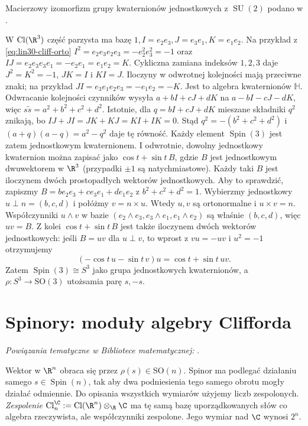 Macierzowy izomorfizm grupy kwaternionów jednostkowych z $\operatorname{SU}(2)$ podano w .

\begin{przyklad}
\label{prz:lin31-spin3}
W $\operatorname{Cl}(\R^3)$ część parzysta ma bazę
$1,I=e_2e_3,J=e_3e_1,K=e_1e_2$.
Na przykład z \eqref{eq:lin30-cliff-orto}
$I^2=e_2e_3e_2e_3=-e_2^2e_3^2=-1$ oraz
$IJ=e_2e_3e_3e_1=-e_2e_1=e_1e_2=K$.
Cykliczna zamiana indeksów $1,2,3$ daje
$J^2=K^2=-1$, $JK=I$ i $KI=J$.
Iloczyny w odwrotnej kolejności mają przeciwne znaki;
na przykład $JI=e_3e_1e_2e_3=-e_1e_2=-K$.
Jest to algebra kwaternionów $\mathbb H$.
Odwracanie kolejności czynników wysyła
$a+bI+cJ+dK$ na $a-bI-cJ-dK$,
więc $s\widetilde s=a^2+b^2+c^2+d^2$.
Istotnie, dla $q=bI+cJ+dK$ mieszane składniki $q^2$
znikają, bo $IJ+JI=JK+KJ=KI+IK=0$.
Stąd $q^2=-(b^2+c^2+d^2)$ i
$(a+q)(a-q)=a^2-q^2$ daje tę równość.
Każdy element $\operatorname{Spin}(3)$
jest zatem jednostkowym kwaternionem.
I odwrotnie, dowolny jednostkowy kwaternion
można zapisać jako $\cos t+\sin t\,B$,
gdzie $B$ jest jednostkowym dwuwektorem
w $\R^3$ (przypadki $\pm1$ są natychmiastowe).
Każdy taki $B$ jest iloczynem dwóch
prostopadłych wektorów jednostkowych. Aby to sprawdzić,
zapiszmy $B=b e_2e_3+c e_3e_1+d e_1e_2$ z $b^2+c^2+d^2=1$.
Wybierzmy jednostkowy $u\perp n=(b,c,d)$ i połóżmy
$v=n\times u$. Wtedy $u,v$ są ortonormalne i $u\times v=n$.
Współczynniki $u\wedge v$ w bazie
$(e_2\wedge e_3,e_3\wedge e_1,e_1\wedge e_2)$ są właśnie $(b,c,d)$,
więc $uv=B$. Z kolei
$\cos t+\sin t\,B$ jest także iloczynem dwóch
wektorów jednostkowych: jeśli $B=uv$ dla
$u\perp v$, to wprost z $vu=-uv$ i $u^2=-1$
otrzymujemy
\[
 (-\cos t\,u-\sin t\,v)u
     =\cos t+\sin t\,uv.
\]
Zatem $\operatorname{Spin}(3)\cong S^3$
jako grupa jednostkowych kwaternionów,
a $\rho:S^3\to\mathrm{SO}(3)$ utożsamia
parę $s,-s$.
\end{przyklad}

\section{Spinory: moduły algebry Clifforda}
\label{sec:lin31-spinory}

\noindent\emph{Powiązania tematyczne w Bibliotece matematycznej:} .


Wektor w $\R^n$ obraca się przez $\rho(s)\in\mathrm{SO}(n)$.
Spinor ma podlegać działaniu samego $s\in\operatorname{Spin}(n)$,
tak aby dwa podniesienia tego samego obrotu mogły
działać odmiennie. Do opisania wszystkich wymiarów
użyjemy liczb zespolonych. \emph{Zespolenie}
$\operatorname{Cl}^{\C}_n:=
\operatorname{Cl}(\R^n)\otimes_\R\C$
ma tę samą bazę uporządkowanych słów co algebra
rzeczywista, ale współczynniki zespolone.
Jego wymiar nad $\C$ wynosi $2^n$.

